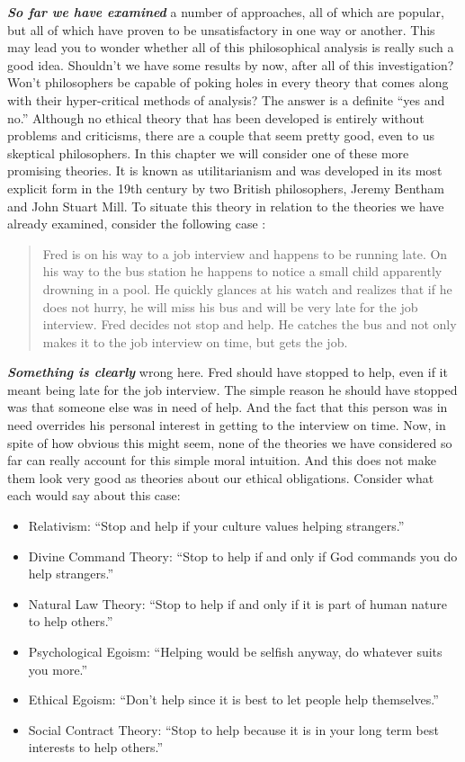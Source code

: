 \documentclass[
  12pt, openany]{book}
\providecommand{\tightlist}{%
  \setlength{\itemsep}{0pt}\setlength{\parskip}{0pt}}
\begin{document}
\textbf{\emph{So far we have examined}} a number of approaches, all of which are popular, but all of which have proven to be unsatisfactory in one way or another. This may lead you to wonder whether all of this philosophical analysis is really such a good idea. Shouldn't we have some results by now, after all of this investigation? Won't philosophers be capable of poking holes in every theory that comes along with their hyper-critical methods of analysis? The answer is a definite ``yes and no.'' Although no ethical theory that has been developed is entirely without problems and criticisms, there are a couple that seem pretty good, even to us skeptical philosophers. In this chapter we will consider one of these more promising theories. It is known as utilitarianism and was developed in its most explicit form in the 19th century by two British philosophers, Jeremy Bentham and John Stuart Mill. To situate this theory in relation to the theories we have already examined, consider the following case :

\begin{quote}
Fred is on his way to a job interview and happens to be running late. On his way to the bus station he happens to notice a small child apparently drowning in a pool. He quickly glances at his watch and realizes that if he does not hurry, he will miss his bus and will be very late for the job interview. Fred decides not stop and help. He catches the bus and not only makes it to the job interview on time, but gets the job.
\end{quote}

\textbf{\emph{Something is clearly}} wrong here. Fred should have stopped to help, even if it meant being late for the job interview. The simple reason he should have stopped was that someone else was in need of help. And the fact that this person was in need overrides his personal interest in getting to the interview on time. Now, in spite of how obvious this might seem, none of the theories we have considered so far can really account for this simple moral intuition. And this does not make them look very good as theories about our ethical obligations. Consider what each would say about this case:

\begin{itemize}
\tightlist
\item
  Relativism: ``Stop and help if your culture values helping strangers.''
\item
  Divine Command Theory: ``Stop to help if and only if God commands you do help strangers.''
\item
  Natural Law Theory: ``Stop to help if and only if it is part of human nature to help others.''
\item
  Psychological Egoism: ``Helping would be selfish anyway, do whatever suits you more.''
\item
  Ethical Egoism: ``Don't help since it is best to let people help themselves.''
\item
  Social Contract Theory: ``Stop to help because it is in your long term best interests to help others.''
\end{itemize}
\end{document}
